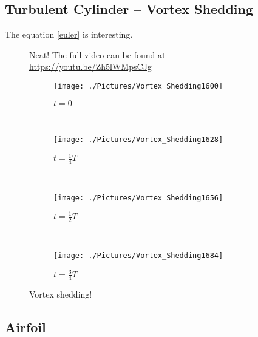 \documentclass[10pt]{article}
\begin{document}

\subsection{Turbulent Cylinder -- Vortex Shedding}

The equation \eqref{euler} is interesting.

\begin{figure}[htb]
\centering
{}
\caption[Vortex Shedding Animation]{Neat! The full video can be found at \url{https://youtu.be/Zh5lWMpsCJg}}
\label{vortexanimation}
\end{figure}

\lipsum[1-2]

\begin{figure}
\begin{subfigure}{\linewidth}
  \centering
  \texttt{[image: ./Pictures/Vortex\_Shedding1600]}
  \caption{$t = 0$}
\end{subfigure} \\
\begin{subfigure}{\textwidth}
  \centering
  \texttt{[image: ./Pictures/Vortex\_Shedding1628]}
  \caption{$t = \frac{1}{4}T$}
\end{subfigure} \\
\begin{subfigure}{\linewidth}
  \centering
  \texttt{[image: ./Pictures/Vortex\_Shedding1656]}
  \caption{$t = \frac{1}{2}T$}
\end{subfigure} \\
\begin{subfigure}{\textwidth}
  \centering
  \texttt{[image: ./Pictures/Vortex\_Shedding1684]}
  \caption{$t = \frac{3}{4}T$}
\end{subfigure}
\caption[Vortex Shedding at $\frac{1}{4}T$ increments]{Vortex shedding!}
\label{fig:vortexshedding}
\end{figure}

\subsection{Airfoil}
\lipsum[4-7]
\end{document}
